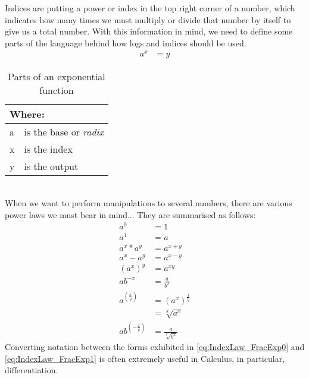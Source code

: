 Indices are putting a power or index in the top right corner of a number,
which indicates how many times we must multiply or divide that number by
itself to give us a total number. With this information in mind, we need to
define some parts of the language behind how logs and indices should be
used.
\begin{align}
  {a}^{x} & = y
  \label{eq:ExponentialForm}
\end{align}
\begin{table}[!hbt]
\label{tab:PartsOfAnExponential}
\begin{tabularx}{\linewidth}{| l X |}
\hline
\multicolumn{2}{|l|}{Where:} \\
\hline \hline
a & is the base or \emph{radix}\\
x & is the index\\
y & is the output\\
\hline
\end{tabularx}
\caption{Parts of an exponential function}
\end{table}
\\
When we want to perform manipulations to several numbers, there are various
power laws we must bear in mind... They are summarised as follows:
\begin{align}
  {a}^{0}               & = 1 \label{eq:IndexLaw_Power0} \\
  {a}^{1}               & = a \label{eq:IndexLaw_Power1} \\
  {a}^{x} * {a}^{y}     & = {a}^{x+y} \label{eq:IndexLaw_AddExps} \\
  {a}^{x} - {a}^{y}     & = {a}^{x-y} \label{eq:IndexLaw_SubExps} \\
  {({a}^{x})}^{y}       & = {a}^{xy} \label{eq:IndexLaw_MultExps} \\
  a{b}^{-x}             & = \frac{a}{{b}^{x}} \label{eq:IndexLaw_NegExp} \\
  {a}^{(\frac{x}{y})}   & = {({a}^{x})}^{\frac{1}{y}}
                            \label{eq:IndexLaw_FracExp0} \\
                        & = \sqrt[y]{{a}^{x}} \label{eq:IndexLaw_FracExp1}\\
  a{b}^{(-\frac{x}{y})} & = \frac{a}{\sqrt[y]{{b}^{x}}}
\end{align}
Converting notation between the forms exhibited in
\ref{eq:IndexLaw_FracExp0} and \ref{eq:IndexLaw_FracExp1} is often
extremely useful in Calculus, in particular, differentiation.

